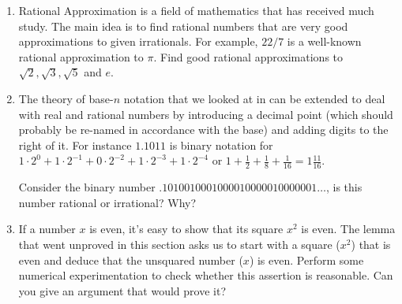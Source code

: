 \begin{enumerate}

\item {} Rational Approximation is 
a field of mathematics that has received much study.  The main idea 
is to find rational numbers that are very good approximations to
given irrationals.  For example, $22/7$ is a well-known rational 
approximation to $\pi$.  Find good rational approximations to 
$\sqrt{2}, \sqrt{3}, \sqrt{5}$ and $e$.

\vfill

\wbvfill


\vfill

\item The theory of base-$n$ notation that we looked at in 
 can be extended to deal with real and 
rational numbers by introducing a decimal point (which should 
probably be re-named in accordance with the base) and adding 
digits to the right of it.  For instance $1.1011$ is binary notation
for $1 \cdot 2^0 + 1 \cdot 2^{-1} + 0 \cdot 2^{-2} + 
1\cdot 2^{-3} + 1\cdot 2^{-4}$ or $\displaystyle 1 + \frac{1}{2} + 
\frac{1}{8} + \frac{1}{16} = 1 \frac{11}{16}$.

Consider the binary number $.1010010001000010000010000001\ldots$, 
is this number rational or irrational?  Why?

\vfill


\workbookpagebreak
\hintspagebreak

\item If a number $x$ is even, it's easy to show that its square $x^2$
is even.  The lemma that went unproved in this section asks us to
start with a square ($x^2$) that is even and deduce that the unsquared
number ($x$) is even.  Perform some numerical experimentation to
check whether this assertion is reasonable.  Can you give an argument
that would prove it?

\vfill


\end{enumerate}
